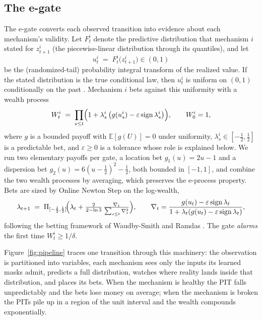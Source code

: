 \documentclass[preprint,12pt]{elsarticle}
\theoremstyle{definition}
\theoremstyle{remark}
\newcommand{\E}{\mathbb{E}}
\begin{document}
\subsection{The e-gate}\label{sec:egate}

The e-gate converts each observed transition into evidence about each
mechanism's validity. Let $F^i_t$ denote the predictive distribution that
mechanism $i$ stated for $z^i_{t+1}$ (the piecewise-linear distribution
through its quantiles), and let
\begin{equation}\label{eq:pit}
u^i_t \;=\; F^i_t\bigl(z^i_{t+1}\bigr)\in(0,1)
\end{equation}
be the (randomized-tail) probability integral transform of the realized
value. If the stated distribution is the true conditional law, then
$u^i_t$ is uniform on $(0,1)$ conditionally on the past
\citep{gneiting2007probabilistic}. Mechanism $i$ bets against this
uniformity with a wealth process
\begin{equation}\label{eq:wealth}
W^i_t \;=\; \prod_{s\le t}\Bigl(1+\lambda^i_s\,
\bigl(g(u^i_s)-\varepsilon\,\mathrm{sign}\,\lambda^i_s\bigr)\Bigr),
\qquad W^i_0=1,
\end{equation}
where $g$ is a bounded payoff with $\E[g(U)]=0$ under uniformity,
$\lambda^i_s\in[-\tfrac12,\tfrac12]$ is a predictable bet, and
$\varepsilon\ge 0$ is a tolerance whose role is explained below. We run
two elementary payoffs per gate, a location bet $g_1(u)=2u-1$ and a
dispersion bet $g_2(u)=6(u-\tfrac12)^2-\tfrac12$, both bounded in
$[-1,1]$, and combine the two wealth processes by averaging, which
preserves the e-process property. Bets are sized by Online Newton Step on
the log-wealth,
\begin{equation}\label{eq:ons}
\lambda_{t+1} \;=\;
\Pi_{[-\frac12,\frac12]}\!\Bigl(\lambda_t+\tfrac{2}{2-\ln 3}\,
\tfrac{\nabla_t}{\sum_{s\le t}\nabla_s^2}\Bigr),
\qquad
\nabla_t=\frac{g(u_t)-\varepsilon\,\mathrm{sign}\,\lambda_t}
{1+\lambda_t(g(u_t)-\varepsilon\,\mathrm{sign}\,\lambda_t)},
\end{equation}
following the betting framework of Waudby-Smith and Ramdas \citep{waudbysmith2024estimating}. The gate \emph{alarms} the
first time $W^i_t\ge 1/\delta$.

Figure~\ref{fig:pipeline} traces one transition through this machinery:
the observation is partitioned into variables, each mechanism sees only
the inputs its learned masks admit, predicts a full distribution, watches
where reality lands inside that distribution, and places its bets. When
the mechanism is healthy the PIT falls unpredictably and the bets lose
money on average; when the mechanism is broken the PITs pile up in a
region of the unit interval and the wealth compounds exponentially.
\end{document}
